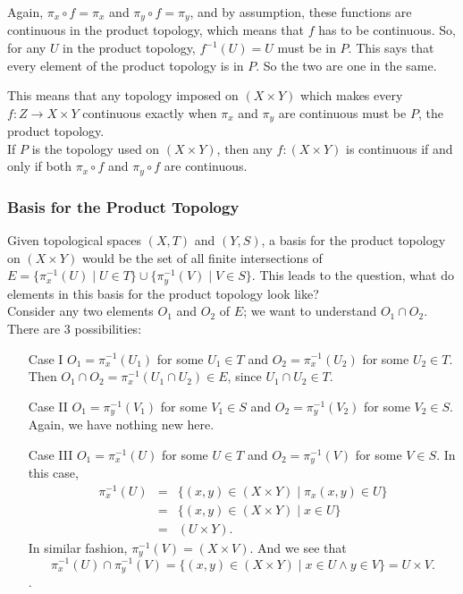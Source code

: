 \documentclass[12pt]{report}
\newcommand{\exercise}{ \noindent{\sc Exercise }\hspace{5pt} }
\newcommand{\inv}[1]{#1^{-1}}
\begin{document}
Again, $\pi_x \circ f = \pi_x$ and $\pi_y \circ f = \pi_y$, and by assumption, 
these functions are continuous in the product topology, which means that $f$
has to be continuous. So, for 
any $U$ in the product topology, $\inv{f}(U) = U$ must be in $P$. This says
that every element of the product topology is in $P$. So the two are one in 
the same.

This means that any topology imposed on $(X \times Y)$ which makes every $f: Z
\rightarrow X \times Y$ continuous exactly when $\pi_x$ and $\pi_y$ are
continuous must be $P$, the product topology.\\

\exercise If $P$ is the topology used on $(X \times Y)$, then any $f:(X \times
Y)$ is continuous if and only if both $\pi_x \circ f$ and $\pi_y \circ f$ are
continuous.\\

\subsubsection{Basis for the Product Topology}

Given topological spaces $(X,T)$ and $(Y,S)$, a basis for the product
topology on $(X \times Y)$ would be the set of all finite intersections
of $E = \{\inv{\pi_x}(U) \mid U \in T \} \cup \{ \inv{\pi_y}(V) \mid V \in
S\}$. This leads to the question, what do elements in this basis for the
product topology look like?\\

Consider any two elements $O_1$ and $O_2$ of $E$; we want to understand 
\mbox{$O_1 \cap O_2$}. There are 3 possibilities: 
\begin{itemize}
\item[Case I] $O_1 = \inv{\pi_x}(U_1)$ for some $U_1 \in T$ and 
$O_2 = \inv{\pi_x}(U_2)$ for some $U_2 \in T$. Then $O_1 \cap
O_2 = \inv{\pi_x}(U_1 \cap U_2) \in E$, since $U_1 \cap U_2 \in T$.

\item[Case II] $O_1 = \inv{\pi_y}(V_1)$ for some $V_1 \in S$ and 
$O_2 = \inv{\pi_y}(V_2)$ for some $V_2 \in S$. Again, we have nothing new
here.

\item[Case III] $O_1 = \inv{\pi_x}(U)$ for some $U \in T$ and $O_2 =
\inv{\pi_y}(V)$ for some $V \in S$. In this case, 
\begin{eqnarray*}
\inv{\pi_x}(U) & = & \{(x,y) \in (X \times Y) \mid \pi_x(x,y) \in U\} \\
               & = & \{(x,y) \in (X \times Y) \mid x \in U\} \\
               & = & (U \times Y).
\end{eqnarray*}
In similar fashion, $\inv{\pi_y}(V) = (X \times V)$. And we see that
\begin{displaymath}
\inv{\pi_x}(U) \cap \inv{\pi_y}(V) = \{(x,y) \in (X \times Y) \mid x \in U
\land y \in V\} = U \times V.
\end{displaymath}.\\
\end{itemize}
\end{document}
